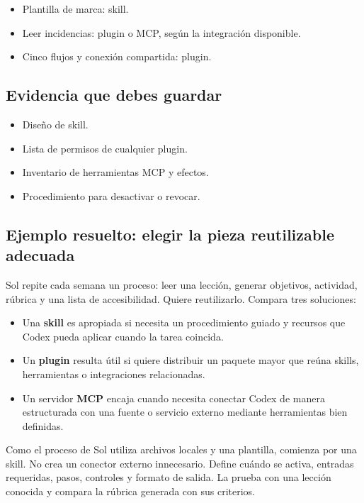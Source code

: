 \documentclass[10pt,a4paper,openany]{book}
\providecommand{\tightlist}{\setlength{\itemsep}{0.18em}\setlength{\parskip}{0pt}}
\begin{document}
\begin{itemize}
\tightlist
\item
  Plantilla de marca: skill.
\item
  Leer incidencias: plugin o MCP, según la integración disponible.
\item
  Cinco flujos y conexión compartida: plugin.
\end{itemize}

\subsection{Evidencia que debes
guardar}\label{evidencia-que-debes-guardar-16}

\begin{itemize}
\tightlist
\item
  Diseño de skill.
\item
  Lista de permisos de cualquier plugin.
\item
  Inventario de herramientas MCP y efectos.
\item
  Procedimiento para desactivar o revocar.
\end{itemize}

\subsection{Ejemplo resuelto: elegir la pieza reutilizable
adecuada}\label{ejemplo-resuelto-elegir-la-pieza-reutilizable-adecuada}

Sol repite cada semana un proceso: leer una lección, generar objetivos,
actividad, rúbrica y una lista de accesibilidad. Quiere reutilizarlo.
Compara tres soluciones:

\begin{itemize}
\tightlist
\item
  Una \textbf{skill} es apropiada si necesita un procedimiento guiado y
  recursos que Codex pueda aplicar cuando la tarea coincida.
\item
  Un \textbf{plugin} resulta útil si quiere distribuir un paquete mayor
  que reúna skills, herramientas o integraciones relacionadas.
\item
  Un servidor \textbf{MCP} encaja cuando necesita conectar Codex de
  manera estructurada con una fuente o servicio externo mediante
  herramientas bien definidas.
\end{itemize}

Como el proceso de Sol utiliza archivos locales y una plantilla,
comienza por una skill. No crea un conector externo innecesario. Define
cuándo se activa, entradas requeridas, pasos, controles y formato de
salida. La prueba con una lección conocida y compara la rúbrica generada
con sus criterios.
\end{document}
